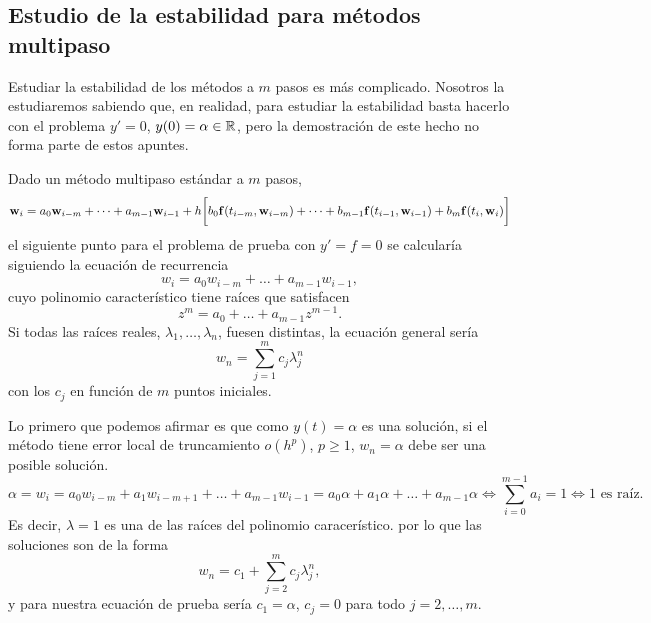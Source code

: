\subsection{Estudio de la estabilidad para métodos multipaso}

Estudiar la estabilidad de los métodos a $m$ pasos es más complicado.
Nosotros la estudiaremos sabiendo que, en realidad,
para estudiar la estabilidad basta hacerlo con el problema
$y' = 0$, $y(0) = \alpha \in \mathbb{R}$,
pero la demostración de este hecho no forma parte de estos apuntes.

Dado un método multipaso estándar a $m$ pasos,
\begin{equation*}
    \vb{w}{}_i = a_0\vb{w}{}_{i-m} + \dots + a_{m-1}\vb{w}{}_{i-1} + h\qty\bigg[
        b_0\vb{f}{}(t_{i-m}, \vb{w}{}_{i-m}) + \dots + b_{m-1}\vb{f}{}(t_{i-1}, \vb{w}{}_{i-1})
        + b_m\vb{f}{}(t_i, \vb{w}{}_i)
    ]
\end{equation*}
el siguiente punto para el problema de prueba con $y' = f = 0$ se calcularía
siguiendo la ecuación de recurrencia
\begin{equation*}
    w_i = a_0w_{i-m} + \dots + a_{m-1}w_{i-1},
\end{equation*}
cuyo polinomio característico tiene raíces que satisfacen
\begin{equation*}
    z^m = a_0 + \dots + a_{m-1}z^{m-1}.
\end{equation*}
Si todas las raíces reales, $\lambda_1,\dots,\lambda_n$, fuesen distintas,
la ecuación general sería
\begin{equation*}
    w_n = \sum_{j=1}^m c_j\lambda_j^n
\end{equation*}
con los $c_j$ en función de $m$ puntos iniciales.

Lo primero que podemos afirmar es que como $y(t) = \alpha$ es una solución,
si el método tiene error local de truncamiento $o(h^p)$, $p \ge 1$,
$w_n = \alpha$ debe ser una posible solución.
\begin{equation*}
    \alpha = w_i =
    a_0w_{i-m} + a_1w_{i-m+1} + \dots + a_{m-1}w_{i-1} =
    a_0\alpha + a_1\alpha + \dots + a_{m-1}\alpha \iff
    \sum_{i = 0}^{m-1} a_i = 1 \iff
    \text{$1$ es raíz.}
\end{equation*}
Es decir, $\lambda = 1$ es una de las raíces del polinomio caracerístico.
por lo que las soluciones son de la forma
\begin{equation*}
    w_n = c_1 + \sum_{j=2}^m c_j\lambda_j^n,
\end{equation*}
y para nuestra ecuación de prueba sería $c_1 = \alpha$,
$c_j = 0$ para todo $j = 2,\ldots,m$.

